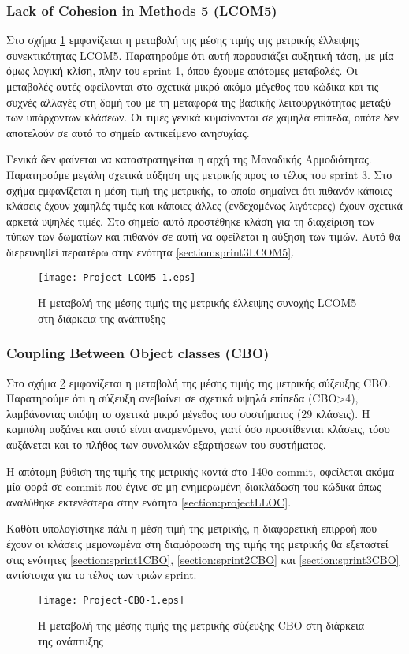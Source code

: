 \subsubsection{Lack of Cohesion in Methods 5 (LCOM5)}

Στο σχήμα \ref{fig:projectLCOM5} εμφανίζεται η μεταβολή της μέσης τιμής
της μετρικής έλλειψης συνεκτικότητας LCOM5. Παρατηρούμε ότι αυτή
παρουσιάζει αυξητική τάση, με μία όμως λογική κλίση, πλην
του sprint 1, όπου έχουμε απότομες μεταβολές. Οι μεταβολές αυτές
οφείλονται στο σχετικά μικρό ακόμα μέγεθος του κώδικα και τις συχνές
αλλαγές στη δομή του με τη μεταφορά της βασικής λειτουργικότητας μεταξύ
των υπάρχοντων κλάσεων. Οι τιμές γενικά κυμαίνονται
σε χαμηλά επίπεδα, οπότε δεν αποτελούν σε αυτό το σημείο αντικείμενο
ανησυχίας.

Γενικά δεν φαίνεται να καταστρατηγείται η αρχή της Μοναδικής
Αρμοδιότητας. Παρατηρούμε μεγάλη σχετικά αύξηση της μετρικής προς το τέλος του
sprint 3.
Στο σχήμα εμφανίζεται η μέση τιμή της μετρικής, το
οποίο σημαίνει ότι πιθανόν κάποιες κλάσεις έχουν χαμηλές τιμές και
κάποιες άλλες (ενδεχομένως λιγότερες) έχουν σχετικά αρκετά υψηλές τιμές.
Στο σημείο αυτό προστέθηκε κλάση για τη διαχείριση των
τύπων των δωματίων και πιθανόν σε αυτή να οφείλεται η αύξηση των τιμών.
Αυτό θα διερευνηθεί περαιτέρω στην ενότητα
\ref{section:sprint3LCOM5}.

\begin{figure}
\centering
\texttt{[image: Project-LCOM5-1.eps]}
\caption{Η μεταβολή της μέσης τιμής της μετρικής έλλειψης συνοχής
LCOM5 στη διάρκεια της ανάπτυξης}
\label{fig:projectLCOM5}
\end{figure}

\subsubsection{Coupling Between Object classes (CBO)}

Στο σχήμα \ref{fig:projectCBO} εμφανίζεται η μεταβολή της μέσης τιμής της
μετρικής σύζευξης CBO. Παρατηρούμε ότι η σύζευξη ανεβαίνει σε σχετικά υψηλά επίπεδα
(CBO>4), λαμβάνοντας υπόψη το σχετικά μικρό μέγεθος του συστήματος
(29 κλάσεις). Η καμπύλη αυξάνει και αυτό είναι αναμενόμενο, γιατί όσο
προστίθενται κλάσεις, τόσο αυξάνεται και το πλήθος των συνολικών
εξαρτήσεων του συστήματος.

Η απότομη βύθιση της τιμής της μετρικής κοντά στο 140ο commit, οφείλεται
ακόμα μία φορά σε commit που έγινε σε μη ενημερωμένη διακλάδωση του
κώδικα όπως αναλύθηκε εκτενέστερα στην ενότητα \ref{section:projectLLOC}.

Καθότι υπολογίστηκε πάλι η μέση τιμή της μετρικής, η διαφορετική επιρροή
που έχουν οι κλάσεις μεμονωμένα στη διαμόρφωση της τιμής της μετρικής θα
εξεταστεί στις ενότητες \ref{section:sprint1CBO},
\ref{section:sprint2CBO} και \ref{section:sprint3CBO} αντίστοιχα για το
τέλος των τριών sprint.

\begin{figure}
\centering
\texttt{[image: Project-CBO-1.eps]}
\caption{Η μεταβολή της μέσης τιμής της μετρικής σύζευξης
CBO στη διάρκεια της ανάπτυξης}
\label{fig:projectCBO}
\end{figure}

